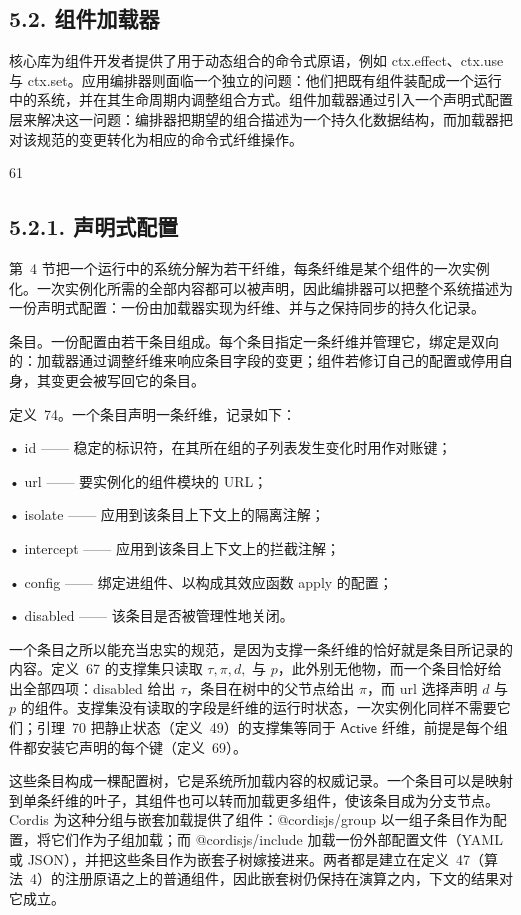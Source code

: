 \subsection{5.2. 组件加载器}\label{component-loader}

核心库为组件开发者提供了用于动态组合的命令式原语，例如 ctx.effect、ctx.use 与 ctx.set。应用编排器则面临一个独立的问题：他们把既有组件装配成一个运行中的系统，并在其生命周期内调整组合方式。组件加载器通过引入一个声明式配置层来解决这一问题：编排器把期望的组合描述为一个持久化数据结构，而加载器把对该规范的变更转化为相应的命令式纤维操作。

61

\subsection{5.2.1. 声明式配置}\label{declarative-configuration}

第~4 节把一个运行中的系统分解为若干纤维，每条纤维是某个组件的一次实例化。一次实例化所需的全部内容都可以被声明，因此编排器可以把整个系统描述为一份声明式配置：一份由加载器实现为纤维、并与之保持同步的持久化记录。

条目。一份配置由若干条目组成。每个条目指定一条纤维并管理它，绑定是双向的：加载器通过调整纤维来响应条目字段的变更；组件若修订自己的配置或停用自身，其变更会被写回它的条目。

定义~74。一个条目声明一条纤维，记录如下：

• id —— 稳定的标识符，在其所在组的子列表发生变化时用作对账键；

• url —— 要实例化的组件模块的 URL；

• isolate —— 应用到该条目上下文上的隔离注解；

• intercept —— 应用到该条目上下文上的拦截注解；

• config —— 绑定进组件、以构成其效应函数 apply 的配置；

• disabled —— 该条目是否被管理性地关闭。

一个条目之所以能充当忠实的规范，是因为支撑一条纤维的恰好就是条目所记录的内容。定义~67 的支撑集只读取 \(\tau , \pi , d ,\) 与 \(p\)，此外别无他物，而一个条目恰好给出全部四项：disabled 给出 \(\tau\)，条目在树中的父节点给出 \(\pi\)，而 url 选择声明 \(d\) 与 \(p\) 的组件。支撑集没有读取的字段是纤维的运行时状态，一次实例化同样不需要它们；引理~70 把静止状态（定义~49）的支撑集等同于 \(\mathsf{Active}\) 纤维，前提是每个组件都安装它声明的每个键（定义~69）。

这些条目构成一棵配置树，它是系统所加载内容的权威记录。一个条目可以是映射到单条纤维的叶子，其组件也可以转而加载更多组件，使该条目成为分支节点。Cordis 为这种分组与嵌套加载提供了组件：@cordisjs/group 以一组子条目作为配置，将它们作为子组加载；而 @cordisjs/include 加载一份外部配置文件（YAML 或 JSON），并把这些条目作为嵌套子树嫁接进来。两者都是建立在定义~47（算法~4）的注册原语之上的普通组件，因此嵌套树仍保持在演算之内，下文的结果对它成立。

